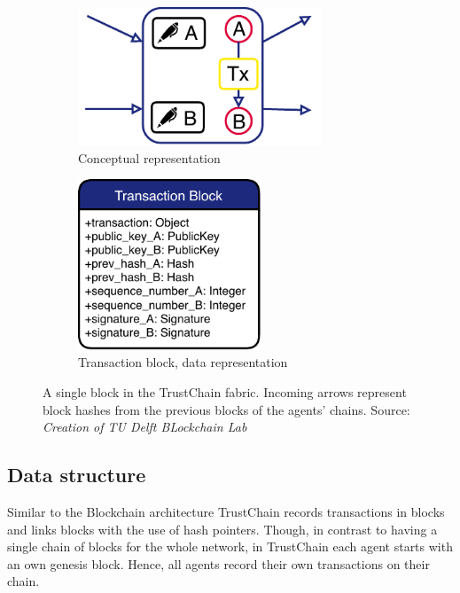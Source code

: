 \begin{figure}
    \centering
    \begin{subfigure}{0.49\textwidth}
        \centering
        \includegraphics[width=0.8\textwidth]{images/block-2.pdf}
        \caption{Conceptual representation}
    \end{subfigure}
    \begin{subfigure}{0.49\textwidth}
        \centering
        \includegraphics[width=0.6\textwidth]{images/transaction_block_data.pdf}
        \caption{Transaction block, data representation}
    \end{subfigure}
    \caption{A single block in the TrustChain fabric. Incoming arrows represent block hashes from the previous blocks of the agents' chains. Source: \textit{Creation of TU Delft BLockchain Lab}}
    \label{fig:trustchain_block}
\end{figure}

\subsection{Data structure}
\label{sec:transaction_blocks}
Similar to the Blockchain architecture TrustChain records transactions in blocks and links blocks 
with the use of hash pointers. Though, in contrast to having a single chain of blocks for the whole
network, in TrustChain each agent starts with an own genesis block. Hence, all agents record their
own transactions on their chain. 

